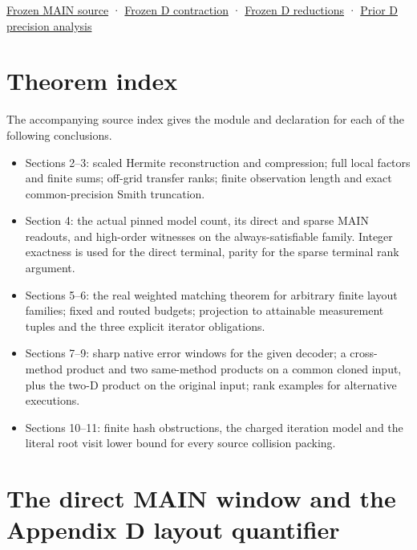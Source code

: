\documentclass[
  11pt,
]{article}
\begin{document}
\href{https://github.com/openai/math/blob/main/preprints/The-Exponential-Time-Hypothesis-is-False-October-25-2026/build/main_full_version.tex}{Frozen
MAIN source} ·
\href{https://github.com/openai/math/blob/main/preprints/The-Exponential-Time-Hypothesis-is-False-October-25-2026/build/quantitative-contraction.tex}{Frozen
D contraction} ·
\href{https://github.com/openai/math/blob/main/preprints/The-Exponential-Time-Hypothesis-is-False-October-25-2026/build/quantitative-reduction.tex}{Frozen
D reductions} ·
\href{https://github.com/dch-and-Elara/some-research-inspired-by-openais-eth-preprint/tree/main/root-separation}{Prior D precision
analysis}

\section{Theorem index}
The accompanying source index gives the module and declaration for each of the following conclusions.
\begin{itemize}
\item Sections 2--3: scaled Hermite reconstruction and compression; full local factors and finite sums; off-grid transfer ranks; finite observation length and exact common-precision Smith truncation.
\item Section 4: the actual pinned model count, its direct and sparse MAIN readouts, and high-order witnesses on the always-satisfiable family. Integer exactness is used for the direct terminal, parity for the sparse terminal rank argument.
\item Sections 5--6: the real weighted matching theorem for arbitrary finite layout families; fixed and routed budgets; projection to attainable measurement tuples and the three explicit iterator obligations.
\item Sections 7--9: sharp native error windows for the given decoder; a cross-method product and two same-method products on a common cloned input, plus the two-D product on the original input; rank examples for alternative executions.
\item Sections 10--11: finite hash obstructions, the charged iteration model and the literal root visit lower bound for every source collision packing.
\end{itemize}
\clearpage
\section{The direct MAIN window and the Appendix D layout quantifier}
\label{sec:window-and-layout}
\end{document}
